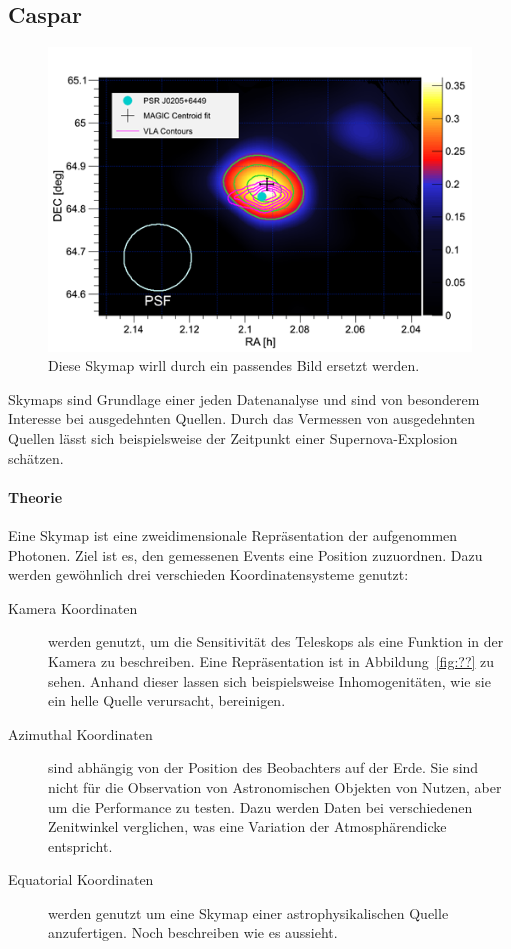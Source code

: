 \subsection{Caspar}%
\label{sub:caspar}
\begin{figure}
    \centering
    \includegraphics[width=\linewidth]{pictures/skymap.png}
    \caption{Diese Skymap wirll durch ein passendes Bild ersetzt werden.}
    \label{fig:skymap}
\end{figure}
Skymaps sind Grundlage einer jeden Datenanalyse
und sind von besonderem Interesse bei ausgedehnten Quellen.
Durch das Vermessen von ausgedehnten Quellen
lässt sich beispielsweise der Zeitpunkt einer Supernova-Explosion schätzen.

\paragraph{Theorie}%
\label{par:theorie}
Eine Skymap ist eine zweidimensionale Repräsentation der aufgenommen Photonen.
Ziel ist es, den gemessenen Events eine Position zuzuordnen.
Dazu werden ge\-wöhn\-lich drei verschieden Koordinatensysteme genutzt:

\begin{description}
	\item[\quad Kamera Koordinaten] werden genutzt, um die Sensitivität des
    Teleskops
		als eine Funktion in der Kamera zu beschreiben.
		Eine Repräsentation ist in Abbildung~\ref{fig:??} zu sehen.
		Anhand dieser lassen sich beispielsweise Inhomogenitäten,
		wie sie ein helle Quelle verursacht, bereinigen.

	\item[\quad Azimuthal Koordinaten] sind abhängig von der Position des
		Beobachters auf der Erde.
		Sie sind nicht für die Observation von Astronomischen Objekten von Nutzen,
		aber um die Performance zu testen.
		Dazu werden Daten bei verschiedenen Zenitwinkel verglichen,
    was eine Variation der Atmosphärendicke entspricht.

	\item[\quad Equatorial Koordinaten] werden genutzt um eine Skymap einer
		astrophysikalischen Quelle anzufertigen.
    {\color{red} Noch beschreiben wie es aussieht.}
\end{description}

